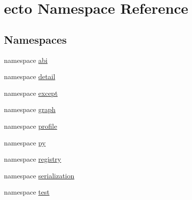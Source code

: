 \hypertarget{namespaceecto}{\section{ecto \-Namespace \-Reference}
\label{namespaceecto}
}
\subsection*{\-Namespaces}
\begin{DoxyCompactItemize}
\item 
namespace \hyperlink{namespaceecto_1_1abi}{abi}
\item 
namespace \hyperlink{namespaceecto_1_1detail}{detail}
\item 
namespace \hyperlink{namespaceecto_1_1except}{except}
\item 
namespace \hyperlink{namespaceecto_1_1graph}{graph}
\item 
namespace \hyperlink{namespaceecto_1_1profile}{profile}
\item 
namespace \hyperlink{namespaceecto_1_1py}{py}
\item 
namespace \hyperlink{namespaceecto_1_1registry}{registry}
\item 
namespace \hyperlink{namespaceecto_1_1serialization}{serialization}
\item 
namespace \hyperlink{namespaceecto_1_1test}{test}
\end{DoxyCompactItemize}
